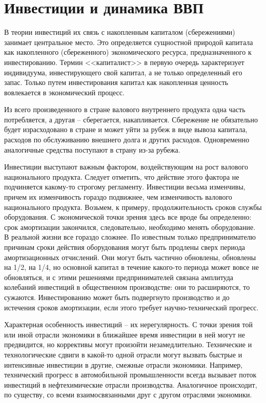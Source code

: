 \chapter{Инвестиции и динамика ВВП}

В теории инвестиций их связь с накопленным капиталом (сбережениями) занимает
центральное место. Это определяется сущностной природой капитала как
накопленного (сбереженного) экономического ресурса, предназначенного к
инвестированию. Термин <<капиталист>> в первую очередь характеризует
индивидуума, инвестирующего свой капитал, а не только определенный его запас.
Только путем инвестирования капитал как накопленная ценность вовлекается в
экономический процесс.

Из всего произведенного в стране валового внутреннего продукта одна часть
потребляется, а другая -- сберегается, накапливается. Сбережение не обязательно
будет израсходовано в стране и может уйти за рубеж в виде вывоза капитала,
расходов по обслуживанию внешнего долга и других расходов. Одновременно
аналогичные средства поступают в страну из-за рубежа.

Инвестиции выступают важным фактором, воздействующим на рост валового
национального продукта. Следует отметить, что действие этого фактора не
подчиняется какому-то строгому регламенту. Инвестиции весьма изменчивы,
причем их изменчивость гораздо подвижнее, чем изменчивость валового
национального продукта. Возьмем, к примеру, продолжительность сроков службы
оборудования. С экономической точки зрения здесь все вроде бы определенно:
срок амортизации закончился, следовательно, необходимо менять оборудование. В
реальной жизни все гораздо сложнее. По известным только предпринимателю
причинам сроки действия оборудования могут быть продлены сверх периода
амортизационных отчислений. Они могут быть частично обновлены, обновлены на
1/2, на 1/4, но основной капитал в течение какого-то периода может вовсе не
обновляться, и с этими решениями предпринимателей связана амплитуда колебаний
инвестиций в общественном производстве: они то расширяются, то сужаются.
Инвестированию может быть подвергнуто производство и до истечения сроков
амортизации, если этого требует научно-технический прогресс.

Характерная особенность инвестиций -- их нерегулярность. С точки зрения той или
иной отрасли экономики в ближайшее время инвестиции в ней могут не предвидится,
но коррективы могут произойти незамедлительно. Технические и технологические
сдвиги в какой-то одной отрасли могут вызвать быстрые и интенсивные инвестиции
в другие, смежные отрасли экономики. Например, технический прогресс в
автомобильной промышленности всегда вызывает поток инвестиций в нефтехимические
отрасли производства. Аналогичное происходит, по существу, со всеми
взаимосвязанными друг с другом отраслями экономики.

